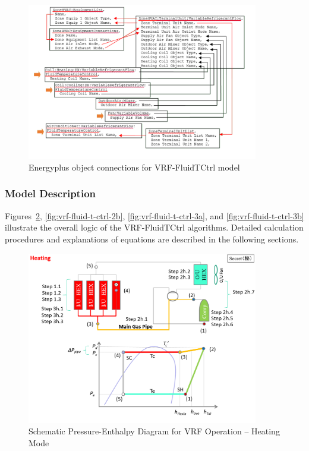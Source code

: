 \begin{figure}[hbtp] %
\centering
\includegraphics[width=0.9\textwidth, height=0.9\textheight, keepaspectratio=true]{media/VRF-FluidTCtrl-1b.png}
\caption{Energyplus object connections for VRF-FluidTCtrl model \label{fig:energyplus-object-connections-for-vrf-fluidtctrl-model}}
\end{figure}

\subsubsection{Model Description}\label{vrf-heat-pump-model-description}

Figures~\ref{fig:vrf-fluid-t-ctrl-2a}, \ref{fig:vrf-fluid-t-ctrl-2b}, \ref{fig:vrf-fluid-t-ctrl-3a}, and \ref{fig:vrf-fluid-t-ctrl-3b} illustrate the overall logic of the VRF-FluidTCtrl algorithms. Detailed calculation procedures and explanations of equations are described in the following sections.

\begin{figure}[hbtp] %
\centering
\includegraphics[width=0.9\textwidth, height=0.9\textheight, keepaspectratio=true]{media/VRF-FluidTCtrl-2a.png}
\caption{Schematic Pressure-Enthalpy Diagram for VRF Operation -- Heating Mode \label{fig:vrf-fluid-t-ctrl-2a}}
\end{figure}

